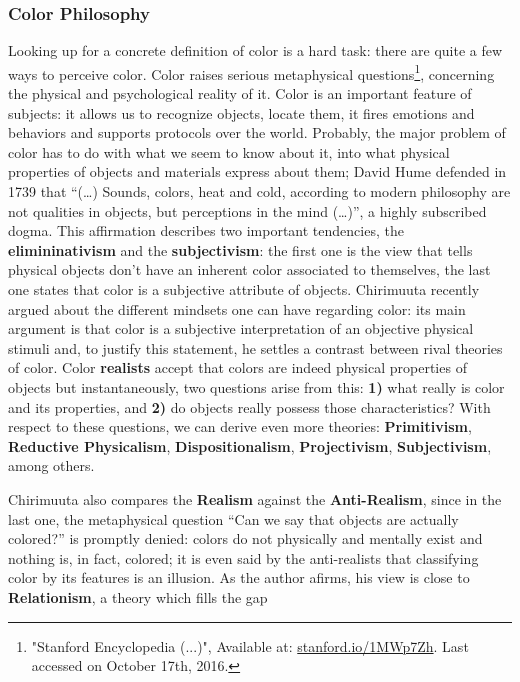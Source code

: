 \subsubsection{Color Philosophy}
\label{sec:colorphilosophy}
Looking up for a concrete definition of color is a hard task: there are quite a few ways to perceive color. Color
raises serious metaphysical questions\footnote{"Stanford Encyclopedia (...)", Available at: \url{stanford.io/1MWp7Zh}. Last accessed on October 17th, 2016.},
concerning the physical and psychological reality of it. Color is an
important feature of subjects: it allows us to recognize objects, locate them, it fires emotions and
behaviors and supports protocols over the world. Probably, the major problem of color has to do with what
we seem to know about it, into what physical properties of objects and materials express about them; David
Hume defended in 1739 \cite{Hume1739} that “(…) Sounds, colors, heat and cold, according to modern philosophy are not
qualities in objects, but perceptions in the mind (…)”, a highly subscribed dogma. This affirmation describes
two important tendencies, the \textbf{elimininativism} and the \textbf{subjectivism}: the first one is the
view that tells physical objects don’t have an inherent color associated to themselves, the last one states
that color is a subjective attribute of objects. Chirimuuta recently argued \cite{Chirimuuta2014} about the different
mindsets one can have regarding color: its main argument is that color is a subjective interpretation of
an objective physical stimuli and, to justify this statement, he settles a contrast between rival theories
of color. Color \textbf{realists} accept that colors are indeed physical properties of objects but instantaneously,
two questions arise from this: \textbf{1)} what really is color and its properties, and \textbf{2)} do objects really possess
those characteristics? With respect to these questions, we can derive even more theories: \textbf{Primitivism}, \textbf{Reductive Physicalism}, \textbf{Dispositionalism}, \textbf{Projectivism}, \textbf{Subjectivism}, among others. \par
%
Chirimuuta \cite{Chirimuuta2014} also compares the \textbf{Realism} against the \textbf{Anti-Realism}, since in the last one, the metaphysical question
“Can we say that objects are actually colored?” is promptly denied: colors do not physically and mentally
exist and nothing is, in fact, colored; it is even said by the anti-realists that classifying color by its features is an  illusion. As the author afirms, his view is close to \textbf{Relationism}, a theory which fills the gap
